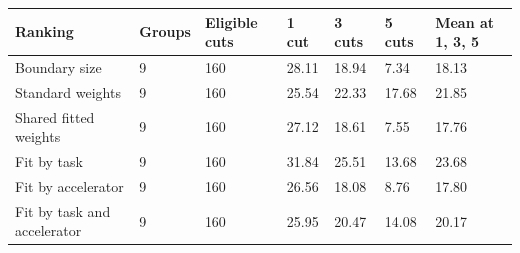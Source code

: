 \begin{tabular}{@{}lllllll@{}}
\toprule
Ranking & Groups & Eligible cuts & 1 cut & 3 cuts & 5 cuts & Mean at 1, 3, 5 \\
\midrule
Boundary size & 9 & 160 & 28.11 & 18.94 & 7.34 & 18.13 \\
Standard weights & 9 & 160 & 25.54 & 22.33 & 17.68 & 21.85 \\
Shared fitted weights & 9 & 160 & 27.12 & 18.61 & 7.55 & 17.76 \\
Fit by task & 9 & 160 & 31.84 & 25.51 & 13.68 & 23.68 \\
Fit by accelerator & 9 & 160 & 26.56 & 18.08 & 8.76 & 17.80 \\
Fit by task and accelerator & 9 & 160 & 25.95 & 20.47 & 14.08 & 20.17 \\
\bottomrule
\end{tabular}
